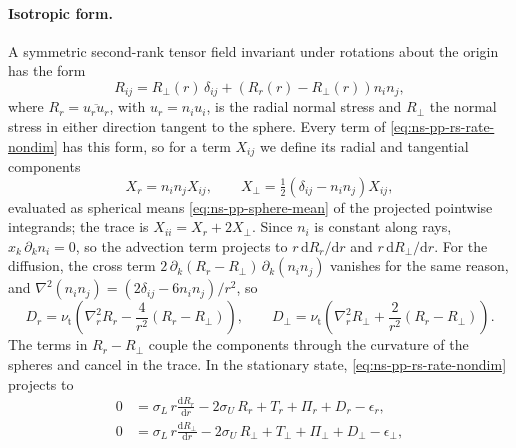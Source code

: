 \documentclass{article}
\begin{document}
\paragraph{Isotropic form.}
A symmetric second-rank tensor field invariant under rotations about the
origin has the form
\begin{equation}\label{eq:ns-pp-rs-isotropic}
  R_{ij} = R_\perp(r)\, \delta_{ij} + \left( R_r(r) - R_\perp(r) \right) n_i n_j ,
\end{equation}
where $R_r = \overline{u_r u_r}$, with $u_r = n_i u_i$, is the radial normal
stress and $R_\perp$ the normal stress in either direction tangent to the
sphere. Every term of \eqref{eq:ns-pp-rs-rate-nondim} has this form, so for a
term $X_{ij}$ we define its radial and tangential components
\begin{equation}\label{eq:ns-pp-rs-projections}
  X_r = n_i n_j X_{ij} ,
  \qquad
  X_\perp = \tfrac{1}{2} \left( \delta_{ij} - n_i n_j \right) X_{ij} ,
\end{equation}
evaluated as spherical means \eqref{eq:ns-pp-sphere-mean} of the projected
pointwise integrands; the trace is $X_{ii} = X_r + 2 X_\perp$. Since $n_i$ is
constant along rays, $x_k\, \partial_k n_i = 0$, so the advection term
projects to $r\, \mathrm{d}R_r/\mathrm{d}r$ and $r\, \mathrm{d}R_\perp/\mathrm{d}r$.
For the diffusion, the cross term
$2\, \partial_k (R_r - R_\perp)\, \partial_k (n_i n_j)$ vanishes for the same
reason, and $\nabla^2 (n_i n_j) = (2\delta_{ij} - 6 n_i n_j)/r^2$, so
\begin{equation}\label{eq:ns-pp-rs-diffusion}
  D_r = \nu_{\mathrm{t}} \left( \nabla_r^2 R_r - \frac{4}{r^2} \left( R_r - R_\perp \right) \right),
  \qquad
  D_\perp = \nu_{\mathrm{t}} \left( \nabla_r^2 R_\perp + \frac{2}{r^2} \left( R_r - R_\perp \right) \right).
\end{equation}
The terms in $R_r - R_\perp$ couple the components through the curvature of
the spheres and cancel in the trace. In the stationary state,
\eqref{eq:ns-pp-rs-rate-nondim} projects to
\begin{equation}\label{eq:ns-pp-rs-radial}
\begin{aligned}
  0 &= \sigma_L\, r \frac{\mathrm{d} R_r}{\mathrm{d} r}
  - 2 \sigma_U\, R_r
  + T_r + \Pi_r + D_r - \epsilon_r , \\
  0 &= \sigma_L\, r \frac{\mathrm{d} R_\perp}{\mathrm{d} r}
  - 2 \sigma_U\, R_\perp
  + T_\perp + \Pi_\perp + D_\perp - \epsilon_\perp ,
\end{aligned}
\end{equation}
\end{document}
